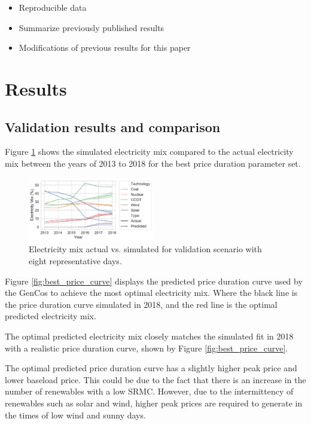 \documentclass[final,3p,times,twocolumn,numbers]{elsarticle}
\begin{document}
\begin{itemize}
	\item Reproducible data
	\item Summarize previously published results
	\item Modifications of previous results for this paper
\end{itemize}

\section{Results}
\label{sec:results}


\subsection{Validation results and comparison}


Figure \ref{fig:actual_vs_simulated_validation} shows the simulated electricity mix compared to the actual electricity mix between the years of 2013 to 2018 for the best price duration parameter set.


\begin{figure}
\centering
\includegraphics[width=0.49\textwidth]{figures/results/throughout_years.pdf}
\caption{Electricity mix actual vs. simulated for validation scenario with eight representative days.}
\label{fig:actual_vs_simulated_validation}
\end{figure}


Figure \ref{fig:best_price_curve} displays the predicted price duration curve used by the GenCos to achieve the most optimal electricity mix. Where the black line is the price duration curve simulated in 2018, and the red line is the optimal predicted electricity mix. 

The optimal predicted electricity mix closely matches the simulated fit in 2018 with a realistic price duration curve, shown by Figure \ref{fig:best_price_curve}.

The optimal predicted price duration curve has a slightly higher peak price and lower baseload price. This could be due to the fact that there is an increase in the number of renewables with a low SRMC. However, due to the intermittency of renewables such as solar and wind, higher peak prices are required to generate in the times of low wind and sunny days.
\end{document}
